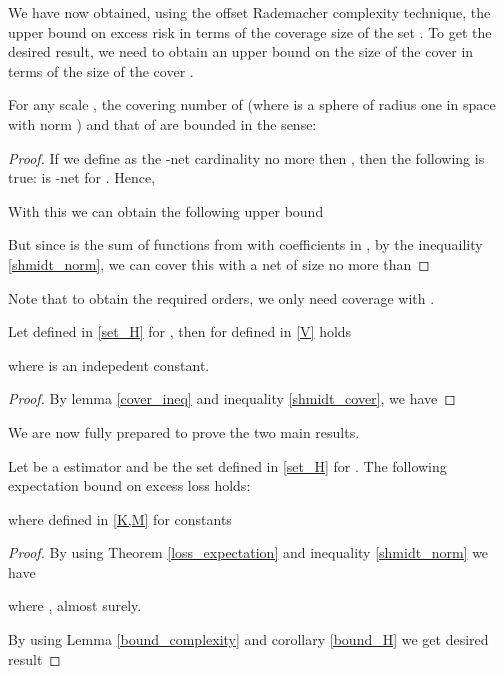     We have now obtained, using the offset Rademacher complexity technique, the upper bound on
    excess risk in terms of the coverage size of the set .
    To get the desired result,  
    we need to obtain an upper bound on the size of the cover  in terms of the size of the cover .
\begin{lemma}
    \label{cover_ineq}
        For any scale , the covering number of  (where  is a sphere of radius one in space with norm ) and that of  are bounded in the sense:
        
    \end{lemma}
\begin{proof}
If we define as  the -net
        cardinality no more then ,
        then the following is true:  is -net for  . Hence,
        
    With this we can obtain the following upper bound

    
    But since  is the sum of  functions from  with coefficients in , by the inequaility \eqref{shmidt_norm}, we can cover this with a net of size no more than
    
\end{proof}

    Note that to obtain the required orders, we only need coverage with .
    
\begin{corollary}
\label{bound_H}
Let  defined in \ref{set_H} for , then for  defined in \ref{V} holds

where  is an indepedent constant.
\end{corollary}
\begin{proof}
By lemma \ref{cover_ineq} and inequality \ref{shmidt_cover}, we have


\end{proof}
    We are now fully prepared to prove the two main results.
    
        \begin{theorem}
        \label{premain_th}
        Let  be a  estimator and  be the set defined in \ref{set_H} for . The following expectation bound on excess loss holds:
        
        where  defined in \eqref{K,M} for constants 
        
        


    \end{theorem}
\begin{proof}
    By using Theorem \ref{loss_expectation} and inequality \ref{shmidt_norm} we have
        
        where ,  almost surely.
    
    
By using  Lemma \ref{bound_complexity} and corollary \ref{bound_H} we get desired result
    
\end{proof}


